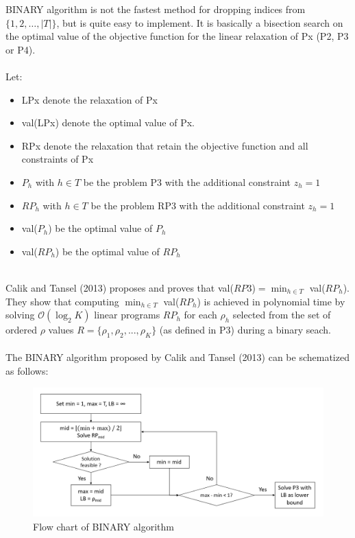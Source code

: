BINARY algorithm is not the fastest method for dropping indices from $\{1, 2, \ldots, |T|\}$, but is quite easy to implement.
It is basically a bisection search on the optimal value of the objective function for the linear relaxation of Px (P2, P3 or P4).\\\\
Let:
\begin{itemize}
	\item LPx denote the relaxation of Px
	\item val(LPx) denote the optimal value of Px.
	\item RPx denote the relaxation that retain the objective function and all constraints of Px
	\item $P_h$ with $h \in T$ be the problem P3 with the additional constraint $z_h = 1$
	\item $RP_h$ with $h \in T$ be the problem RP3 with the additional constraint $z_h = 1$
	\item val($P_h$) be the optimal value of $P_h$
	\item val($RP_h$) be the optimal value of $RP_h$
\end{itemize}\ \\
Calik and Tansel (2013) proposes and proves that val($RP3$)$ = \min_{h \in T}$ val($RP_h$). They show that computing $\min_{h \in T}$ val($RP_h$) is achieved in polynomial time by solving $\mathcal{O}\left( \log_2 K \right)$ linear programs $RP_h$ for each $\rho_h$ selected from the set of ordered $\rho$ values $R = \lbrace \rho_1, \rho_2, ..., \rho_K \rbrace$ (as defined in P3) during a binary seach.\\\\
The BINARY algorithm proposed by Calik and Tansel (2013) can be schematized as follows:
\begin{figure}[H]
	\begin{center}
		\includegraphics[width=\textwidth]{../imgs/BINARY.png}
		\caption{Flow chart of BINARY algorithm}
	\end{center}
\end{figure}
